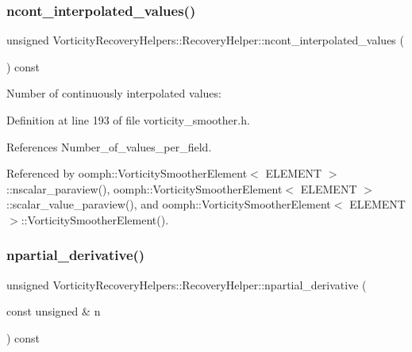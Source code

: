 \mbox{\label{classVorticityRecoveryHelpers_1_1RecoveryHelper_a552a9daee2699b515a3b81113f800b54}} 
\subsubsection{\texorpdfstring{ncont\+\_\+interpolated\+\_\+values()}{ncont\_interpolated\_values()}}
{\footnotesize\ttfamily unsigned Vorticity\+Recovery\+Helpers\+::\+Recovery\+Helper\+::ncont\+\_\+interpolated\+\_\+values (\begin{DoxyParamCaption}{ }\end{DoxyParamCaption}) const\hspace{0.3cm}{\ttfamily [inline]}}



Number of continuously interpolated values\+: 



Definition at line 193 of file vorticity\+\_\+smoother.\+h.



References Number\+\_\+of\+\_\+values\+\_\+per\+\_\+field.



Referenced by oomph\+::\+Vorticity\+Smoother\+Element$<$ E\+L\+E\+M\+E\+N\+T $>$\+::nscalar\+\_\+paraview(), oomph\+::\+Vorticity\+Smoother\+Element$<$ E\+L\+E\+M\+E\+N\+T $>$\+::scalar\+\_\+value\+\_\+paraview(), and oomph\+::\+Vorticity\+Smoother\+Element$<$ E\+L\+E\+M\+E\+N\+T $>$\+::\+Vorticity\+Smoother\+Element().

\mbox{\label{classVorticityRecoveryHelpers_1_1RecoveryHelper_ae89029d89e2497fb767027bd44a6fa68}} 
\subsubsection{\texorpdfstring{npartial\+\_\+derivative()}{npartial\_derivative()}}
{\footnotesize\ttfamily unsigned Vorticity\+Recovery\+Helpers\+::\+Recovery\+Helper\+::npartial\+\_\+derivative (\begin{DoxyParamCaption}\item[{const unsigned \&}]{n }\end{DoxyParamCaption}) const\hspace{0.3cm}{\ttfamily [inline]}}



